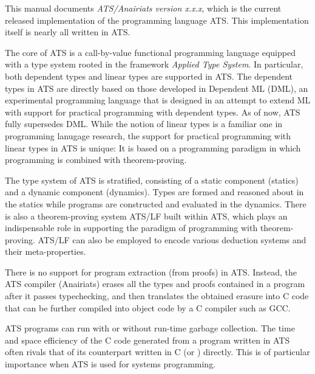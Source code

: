 This manual documents {\em ATS/Anairiats version x.x.x}, which is the
current released implementation of the programming language ATS. This
implementation itself is nearly all written in ATS.

The core of ATS is a call-by-value functional programming language equipped
with a type system rooted in the framework {\em Applied Type System}. In
particular, both dependent types and linear types are supported in ATS. The
dependent types in ATS are directly based on those developed in Dependent
ML (DML), an experimental programming language that is designed in an
attempt to extend ML with support for practical programming with dependent
types. As of now, ATS fully supersedes DML. While the notion of linear
types is a familiar one in programming lanugage research, the support for
practical programming with linear types in ATS is unique: It is based on a
programming paradigm in which programming is combined with theorem-proving.

The type system of ATS is stratified, consisting of a static component
(statics) and a dynamic component (dynamics). Types are formed and reasoned
about in the statics while programs are constructed and evaluated in the
dynamics. There is also a theorem-proving system ATS/LF built within ATS,
which plays an indispensable role in supporting the paradigm of programming
with theorem-proving. ATS/LF can also be employed to encode various
deduction systems and their meta-properties.

There is no support for program extraction (from proofs) in ATS. Instead,
the ATS compiler (Anairiats) erases all the types and proofs contained in a
program after it passes typechecking, and then translates the obtained
erasure into C code that can be further compiled into object code by a C
compiler such as GCC.

ATS programs can run with or without run-time garbage collection. The time
and space efficiency of the C code generated from a program written in ATS
often rivals that of its counterpart written in C (or \cplusplus)
directly. This is of particular importance when ATS is used for systems
programming.

